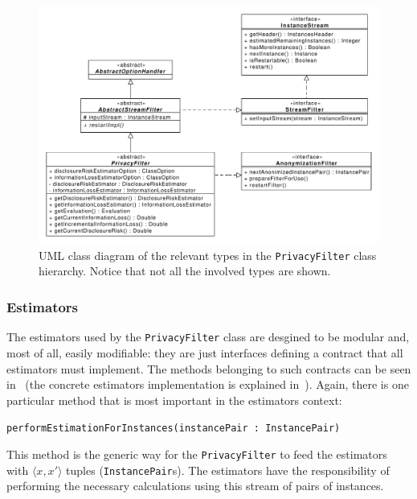 \begin{figure}[h]
	\centering
	\includegraphics[width=1.0\textwidth]{figures/class_PrivacyFilter.pdf}
	\caption{UML class diagram of the relevant types in the \texttt{PrivacyFilter} class hierarchy. Notice that not all the involved types are shown.}
	\label{fig:privacy-filter-uml}
\end{figure}

\subsubsection*{Estimators}
\label{Implementation:PrivacyFilter:PrivacyFilter:Estimators}

The estimators used by the \texttt{PrivacyFilter} class are desgined to be modular and, most of all, easily modifiable: they are just interfaces defining a contract that all estimators must implement. The methods belonging to such contracts can be seen in~ (the concrete estimators implementation is explained in~). Again, there is one particular method that is most important in the estimators context:

\begin{center}
\texttt{performEstimationForInstances(instancePair : InstancePair)}
\end{center}

This method is the generic way for the \texttt{PrivacyFilter} to feed the estimators with $\langle x, x' \rangle$ tuples (\texttt{InstancePair}s). The estimators have the responsibility of performing the necessary calculations using this stream of pairs of instances.

